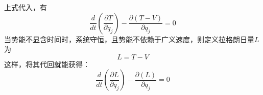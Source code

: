 上式代入，有
\begin{equation}
	\frac{d}{dt} \left(\frac{\partial T}{\partial \dot{q}_j}\right) - \frac{\partial (T - V)}{\partial q_j} = 0
	\label{eq:pre-lagrangian-eq}
\end{equation}
当势能不显含时间时，系统守恒，且势能不依赖于广义速度，则定义拉格朗日量$L$为
\begin{equation}
	L = T - V
	\label{eq:lagrangian}
\end{equation}
这样，将其代回就能获得：
\begin{equation}
	\frac{d}{dt} \left(\frac{\partial L}{\partial \dot{q}_j}\right) - \frac{\partial (L)}{\partial q_j} = 0
\end{equation}